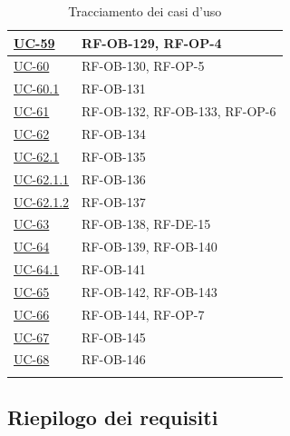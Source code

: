\documentclass[a4paper,12pt]{article}
\begin{document}
\begin{center}
\begin{longtable}{|>{\centering\arraybackslash}p{5cm}|>{\centering\arraybackslash}p{9cm}|}
\hyperref[sec:UC-59]{UC-59} & RF-OB-129, RF-OP-4 \\
\hline

\hyperref[sec:UC-60]{UC-60} & RF-OB-130, RF-OP-5 \\
\hline

\hyperref[subsec:UC-60.1]{UC-60.1} & RF-OB-131 \\
\hline

\hyperref[sec:UC-61]{UC-61} & RF-OB-132, RF-OB-133, RF-OP-6 \\
\hline

\hyperref[sec:UC-62]{UC-62} & RF-OB-134 \\
\hline

\hyperref[subsec:UC-62.1]{UC-62.1} & RF-OB-135 \\
\hline

\hyperref[subsec:UC-62.1.1]{UC-62.1.1} & RF-OB-136 \\
\hline

\hyperref[subsec:UC-62.1.2]{UC-62.1.2} & RF-OB-137 \\
\hline

\hyperref[sec:UC-63]{UC-63} & RF-OB-138, RF-DE-15 \\
\hline

\hyperref[sec:UC-64]{UC-64} & RF-OB-139, RF-OB-140 \\
\hline

\hyperref[subsec:UC-64.1]{UC-64.1} & RF-OB-141 \\
\hline

\hyperref[sec:UC-65]{UC-65} & RF-OB-142, RF-OB-143 \\
\hline

\hyperref[sec:UC-66]{UC-66} & RF-OB-144, RF-OP-7 \\
\hline

\hyperref[subsec:UC-67]{UC-67} & RF-OB-145 \\
\hline

\hyperref[subsec:UC-68]{UC-68} & RF-OB-146 \\
\hline
\caption{Tracciamento dei casi d'uso} \label{tab:tracciamento_uc} \\
\end{longtable}
\end{center}


\pagebreak

\subsection{Riepilogo dei requisiti} \label{subsection:riepilogo_requisiti}
\end{document}
